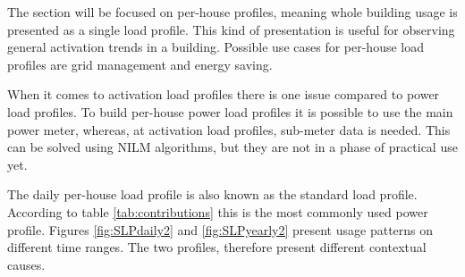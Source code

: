 The section will be focused on per-house profiles, meaning whole building usage is presented as a single load profile.
This kind of presentation is useful for observing general activation trends in a building.
Possible use cases for per-house load profiles are grid management and energy saving.

When it comes to activation load profiles there is one issue compared to power load profiles.
To build per-house power load profiles it is possible to use the main power meter, whereas, at activation load profiles, sub-meter data is needed.
This can be solved using NILM algorithms, but they are not in a phase of practical use yet.

The daily per-house load profile is also known as the standard load profile. 
According to table \ref{tab:contributions} this is the most commonly used power profile.
Figures \ref{fig:SLPdaily2} and \ref{fig:SLPyearly2} present usage patterns on different time ranges. 
The two profiles, therefore present different contextual causes.


